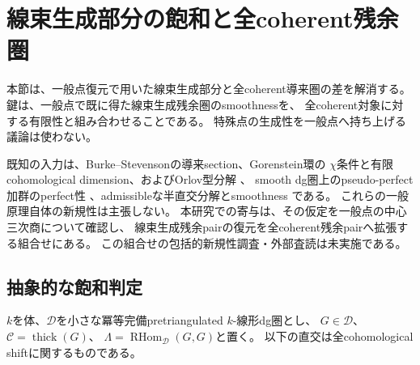 \section{線束生成部分の飽和と全coherent残余圏}
\label{crs:sec:saturation}

本節は、一般点復元で用いた線束生成部分と全coherent導来圏の差を解消する。
鍵は、一般点で既に得た線束生成残余圏のsmoothnessを、
全coherent対象に対する有限性と組み合わせることである。
特殊点の生成性を一般点へ持ち上げる議論は使わない。

既知の入力は、Burke--Stevensonの導来section、Gorenstein環の
$\chi$条件と有限cohomological dimension、およびOrlov型分解
\cite[Proposition~4.18, Lemmas~6.1--6.2, Theorem~6.4]{CRSBS}、
smooth dg圏上のpseudo-perfect加群のperfect性
\cite[Lemma~2.8(2)]{CRSTV}、admissibleな半直交分解とsmoothness
\cite[Lemma~4.15(3)]{CRSPerry}である。
これらの一般原理自体の新規性は主張しない。
本研究での寄与は、その仮定を一般点の中心三次商について確認し、
線束生成残余pairの復元を全coherent残余pairへ拡張する組合せにある。
この組合せの包括的新規性調査・外部査読は未実施である。

\subsection{抽象的な飽和判定}

$k$を体、$\mathcal D$を小さな冪等完備pretriangulated $k$-線形dg圏とし、
$G\in\mathcal D$、$\mathcal C=\operatorname{thick}(G)$、
$\Lambda=\operatorname{RHom}_{\mathcal D}(G,G)$と置く。
以下の直交は全cohomological shiftに関するものである。

